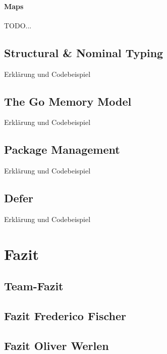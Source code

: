 \documentclass[12pt,titlepage]{article}
\begin{document}
\paragraph{Maps}
TODO...

\subsection{Structural \& Nominal Typing}
Erklärung und Codebeispiel


\subsection{The Go Memory Model}
Erklärung und Codebeispiel


\subsection{Package Management}
Erklärung und Codebeispiel


\subsection{Defer}
Erklärung und Codebeispiel

\section{Fazit}
\subsection{Team-Fazit}

\subsection{Fazit Frederico Fischer}

\subsection{Fazit Oliver Werlen}

    
\end{document}

